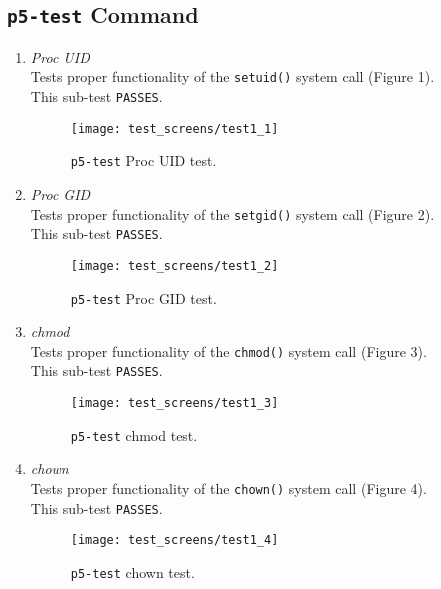 \documentclass[11pt,letterpaper]{report}
\begin{document}
	\subsection{{\tt p5-test} Command}
	\begin{enumerate}
		\item \emph{Proc UID}\\
		Tests proper functionality of the {\tt setuid()} system call ({\color{red}Figure 1}).\\
		This sub-test {\tt PASSES}.
		
		\begin{figure}
			\centering
			\texttt{[image: test\_screens/test1\_1]}
			\caption{{\tt p5-test} Proc UID test.}
			\label{fig:test11}
		\end{figure}

		\item \emph{Proc GID}\\
		Tests proper functionality of the {\tt setgid()} system call ({\color{red}Figure 2}).\\
		This sub-test {\tt PASSES}.
		
		\begin{figure}
			\centering
			\texttt{[image: test\_screens/test1\_2]}
			\caption{{\tt p5-test} Proc GID test.}
			\label{fig:test12}
		\end{figure}

		\item \emph{chmod}\\
		Tests proper functionality of the {\tt chmod()} system call ({\color{red}Figure 3}).\\
		This sub-test {\tt PASSES}.
		
		\begin{figure}
			\centering
			\texttt{[image: test\_screens/test1\_3]}
			\caption{{\tt p5-test} chmod test.}
			\label{fig:test13}
		\end{figure}
	
		\item \emph{chown}\\
		Tests proper functionality of the {\tt chown()} system call ({\color{red}Figure 4}).\\
		This sub-test {\tt PASSES}.
		
		\begin{figure}
			\centering
			\texttt{[image: test\_screens/test1\_4]}
			\caption{{\tt p5-test} chown test.}
			\label{fig:test14}
		\end{figure}
	

\end{enumerate}
\end{document}
